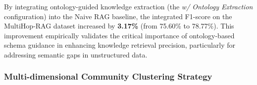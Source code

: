 \documentclass[11pt]{article}
\begin{document}
\begin{table}[H]
    \centering
    \caption{Ablation Study Results on MultiHop-RAG}
    \label{tab:ablation_results}
    \setlength{\tabcolsep}{3pt} %
    \small
\end{table}

By integrating ontology-guided knowledge extraction (the \textit{w/ Ontology Extraction} configuration) into the Naive RAG baseline, the integrated F1-score on the MultiHop-RAG dataset increased by \textbf{3.17\%} (from 75.60\% to 78.77\%). This improvement empirically validates the critical importance of ontology-based schema guidance in enhancing knowledge retrieval precision, particularly for addressing semantic gaps in unstructured data.

\subsubsection{Multi-dimensional Community Clustering Strategy}
\end{document}
